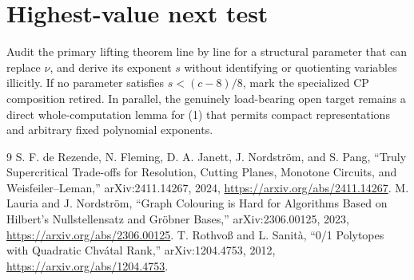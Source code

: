 \documentclass[11pt]{article}
\begin{document}
\section{Highest-value next test}
Audit the primary lifting theorem line by line for a structural parameter
that can replace \(\nu\), and derive its exponent \(s\) without identifying
or quotienting variables illicitly.  If no parameter satisfies
\(s<(c-8)/8\), mark the specialized CP composition retired.  In parallel,
the genuinely load-bearing open target remains a direct whole-computation
lemma for (1) that permits compact representations and arbitrary fixed
polynomial exponents.

\begin{thebibliography}{9}
S. F. de Rezende, N. Fleming, D. A. Janett, J. Nordstr\"om, and S. Pang,
``Truly Supercritical Trade-offs for Resolution, Cutting Planes, Monotone
Circuits, and Weisfeiler--Leman,'' arXiv:2411.14267, 2024,
\url{https://arxiv.org/abs/2411.14267}.
M. Lauria and J. Nordstr\"om, ``Graph Colouring is Hard for Algorithms Based
on Hilbert's Nullstellensatz and Gr\"obner Bases,'' arXiv:2306.00125, 2023,
\url{https://arxiv.org/abs/2306.00125}.
T. Rothvo\ss{} and L. Sanit\`a, ``0/1 Polytopes with Quadratic Chv\'atal
Rank,'' arXiv:1204.4753, 2012,
\url{https://arxiv.org/abs/1204.4753}.
\end{thebibliography}
\end{document}
